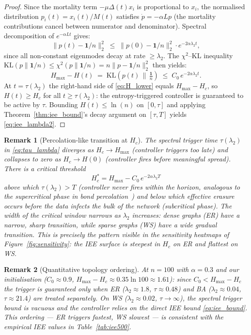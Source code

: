 \documentclass[review,12pt]{elsarticle}
\newcommand{\Hc}{H_c}
\newcommand{\Hmax}{H_{\max}}
\newcommand{\lambdat}{\lambda_2}
\newtheorem{remark}{Remark}
\begin{document}
\begin{proof}
Since the mortality term $-\mu\Delta(t)x_i$ is proportional to $x_i$,
the normalised distribution $p_i(t) = x_i(t)/M(t)$ satisfies
$\dot{p} = -\alpha Lp$ (the mortality contributions cancel between
numerator and denominator).  Spectral decomposition of $e^{-\alpha Lt}$
gives:
\[
  \|p(t) - \mathbf{1}/n\|_2^2 \;\leq\; \|p(0) - \mathbf{1}/n\|_2^2
    \cdot e^{-2\alpha\lambdat t},
\]
since all non-constant eigenmodes decay at rate $\geq \lambda_2$.
The $\chi^2$--KL inequality $\mathrm{KL}(p\|\mathbf{1}/n) \leq \chi^2(p\|\mathbf{1}/n)
= n\|p - \mathbf{1}/n\|_2^2$ then yields:
\begin{equation}
  \Hmax - H(t) \;=\; \mathrm{KL}\!\left(p(t)\,\Big\|\,\tfrac{\mathbf{1}}{n}\right)
  \;\leq\; C_0\,e^{-2\alpha\lambdat t}.
  \label{eq:H_lower}
\end{equation}
At $t = \tau(\lambdat)$ the right-hand side of \eqref{eq:H_lower} equals
$\Hmax - \Hc$, so $H(t) \geq \Hc$ for all $t \geq \tau(\lambdat)$:
the entropy-triggered controller is guaranteed to be active by $\tau$.
Bounding $H(t) \leq \ln(n)$ on $[0,\tau]$ and applying
Theorem~\ref{thm:iee_bound}'s decay argument on $[\tau, T]$ yields
\eqref{eq:iee_lambda2}.
\end{proof}

\begin{remark}[Percolation-like transition at $\Hc$]
\label{rem:percolation}
The spectral trigger time $\tau(\lambdat)$ in \eqref{eq:tau_lambda}
diverges as $\Hc \to \Hmax$ (controller triggers too late) and collapses
to zero as $\Hc \to H(0)$ (controller fires before meaningful spread).
There is a critical threshold
\[
  \Hc^* = \Hmax - C_0\,e^{-2\alpha\lambdat T}
\]
above which $\tau(\lambdat) > T$ (controller never fires within the
horizon, analogous to the \emph{supercritical} phase in bond
percolation~\cite{bollobas2006percolation}) and below which effective
erasure occurs before the data infects the bulk of the network
(\emph{subcritical} phase).  The width of the critical window narrows
as $\lambdat$ increases: dense graphs (ER) have a narrow, sharp
transition, while sparse graphs (WS) have a wide gradual transition.
This is precisely the pattern visible in the sensitivity heatmaps of
Figure~\ref{fig:sensitivity}: the IEE surface is steepest in $\Hc$
on ER and flattest on WS.
\end{remark}

\begin{remark}[Quantitative topology ordering]
\label{rem:lambda2}
At $n=100$ with $\alpha=0.3$ and our initialisation ($C_0\approx 0.9$,
$\Hmax-\Hc\approx 0.35\ln 100 \approx 1.61$): since $C_0 < \Hmax-\Hc$
the trigger is guaranteed only when ER ($\lambdat\approx 1.8$, $\tau\approx
0.48$) and BA ($\lambdat\approx 0.04$, $\tau\approx 21.4$) are treated
separately.  On WS ($\lambdat\approx 0.02$, $\tau\to\infty$), the spectral
trigger bound is vacuous and the controller relies on the direct IEE bound
\eqref{eq:iee_bound}.  This ordering --- ER triggers fastest, WS slowest
--- is consistent with the empirical IEE values in Table~\ref{tab:iee500}.
\end{remark}
\end{document}
